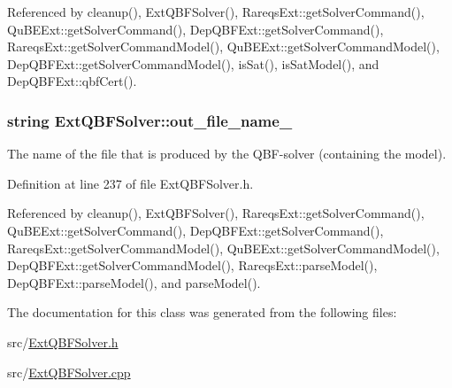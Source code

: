 Referenced by cleanup(), Ext\-Q\-B\-F\-Solver(), Rareqs\-Ext\-::get\-Solver\-Command(), Qu\-B\-E\-Ext\-::get\-Solver\-Command(), Dep\-Q\-B\-F\-Ext\-::get\-Solver\-Command(), Rareqs\-Ext\-::get\-Solver\-Command\-Model(), Qu\-B\-E\-Ext\-::get\-Solver\-Command\-Model(), Dep\-Q\-B\-F\-Ext\-::get\-Solver\-Command\-Model(), is\-Sat(), is\-Sat\-Model(), and Dep\-Q\-B\-F\-Ext\-::qbf\-Cert().

\hypertarget{classExtQBFSolver_a0efb35aa9b807dec521ad3406eaf664d}{
\subsubsection[{out\-\_\-file\-\_\-name\-\_\-}]{\setlength{\rightskip}{0pt plus 5cm}string Ext\-Q\-B\-F\-Solver\-::out\-\_\-file\-\_\-name\-\_\-\hspace{0.3cm}{\ttfamily [protected]}}}\label{classExtQBFSolver_a0efb35aa9b807dec521ad3406eaf664d}


The name of the file that is produced by the Q\-B\-F-\/solver (containing the model). 



Definition at line 237 of file Ext\-Q\-B\-F\-Solver.\-h.



Referenced by cleanup(), Ext\-Q\-B\-F\-Solver(), Rareqs\-Ext\-::get\-Solver\-Command(), Qu\-B\-E\-Ext\-::get\-Solver\-Command(), Dep\-Q\-B\-F\-Ext\-::get\-Solver\-Command(), Rareqs\-Ext\-::get\-Solver\-Command\-Model(), Qu\-B\-E\-Ext\-::get\-Solver\-Command\-Model(), Dep\-Q\-B\-F\-Ext\-::get\-Solver\-Command\-Model(), Rareqs\-Ext\-::parse\-Model(), Dep\-Q\-B\-F\-Ext\-::parse\-Model(), and parse\-Model().



The documentation for this class was generated from the following files\-:\begin{DoxyCompactItemize}
\item 
src/\hyperlink{ExtQBFSolver_8h}{Ext\-Q\-B\-F\-Solver.\-h}\item 
src/\hyperlink{ExtQBFSolver_8cpp}{Ext\-Q\-B\-F\-Solver.\-cpp}\end{DoxyCompactItemize}
